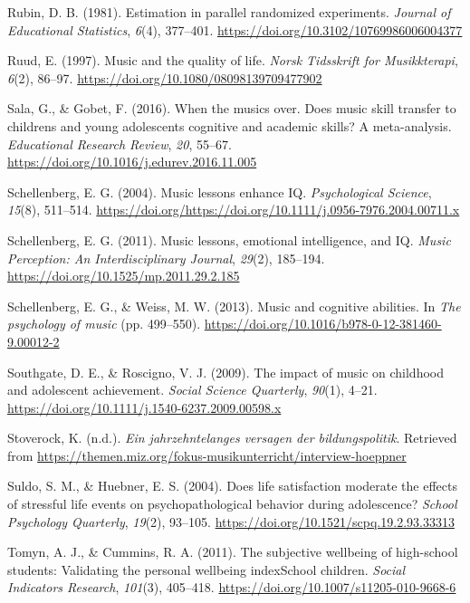 \documentclass[a4, 12pt]{article}
\begin{document}
\leavevmode\hypertarget{ref-Rubin1981}{}%
Rubin, D. B. (1981). Estimation in parallel randomized experiments. \emph{Journal of Educational Statistics}, \emph{6}(4), 377--401. \url{https://doi.org/10.3102/10769986006004377}

\leavevmode\hypertarget{ref-Ruud1997}{}%
Ruud, E. (1997). Music and the quality of life. \emph{Norsk Tidsskrift for Musikkterapi}, \emph{6}(2), 86--97. \url{https://doi.org/10.1080/08098139709477902}

\leavevmode\hypertarget{ref-Sala2016}{}%
Sala, G., \& Gobet, F. (2016). When the musics over. Does music skill transfer to childrens and young adolescents cognitive and academic skills? A meta-analysis. \emph{Educational Research Review}, \emph{20}, 55--67. \url{https://doi.org/10.1016/j.edurev.2016.11.005}

\leavevmode\hypertarget{ref-Schellenberg2004}{}%
Schellenberg, E. G. (2004). Music lessons enhance IQ. \emph{Psychological Science}, \emph{15}(8), 511--514. \url{https://doi.org/https://doi.org/10.1111/j.0956-7976.2004.00711.x}

\leavevmode\hypertarget{ref-Schellenberg2011a}{}%
Schellenberg, E. G. (2011). Music lessons, emotional intelligence, and IQ. \emph{Music Perception: An Interdisciplinary Journal}, \emph{29}(2), 185--194. \url{https://doi.org/10.1525/mp.2011.29.2.185}

\leavevmode\hypertarget{ref-Schellenberg2013}{}%
Schellenberg, E. G., \& Weiss, M. W. (2013). Music and cognitive abilities. In \emph{The psychology of music} (pp. 499--550). \url{https://doi.org/10.1016/b978-0-12-381460-9.00012-2}

\leavevmode\hypertarget{ref-Southgate2009}{}%
Southgate, D. E., \& Roscigno, V. J. (2009). The impact of music on childhood and adolescent achievement. \emph{Social Science Quarterly}, \emph{90}(1), 4--21. \url{https://doi.org/10.1111/j.1540-6237.2009.00598.x}

\leavevmode\hypertarget{ref-Stoverock}{}%
Stoverock, K. (n.d.). \emph{Ein jahrzehntelanges versagen der bildungspolitik}. Retrieved from \url{https://themen.miz.org/fokus-musikunterricht/interview-hoeppner}

\leavevmode\hypertarget{ref-Suldo2004}{}%
Suldo, S. M., \& Huebner, E. S. (2004). Does life satisfaction moderate the effects of stressful life events on psychopathological behavior during adolescence? \emph{School Psychology Quarterly}, \emph{19}(2), 93--105. \url{https://doi.org/10.1521/scpq.19.2.93.33313}

\leavevmode\hypertarget{ref-Tomyn2011a}{}%
Tomyn, A. J., \& Cummins, R. A. (2011). The subjective wellbeing of high-school students: Validating the personal wellbeing indexSchool children. \emph{Social Indicators Research}, \emph{101}(3), 405--418. \url{https://doi.org/10.1007/s11205-010-9668-6}
\end{document}
